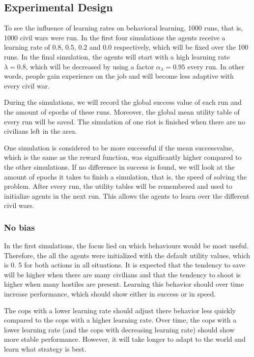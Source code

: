\subsection{Experimental Design}
To see the influence of learning rates on behavioral learning, 1000 runs, that is, 1000 civil wars were run.
In the first four simulations the agents receive a learning rate of $0.
8$, $0.
5$, $0.
2$ and $0.
0$ respectively, which will be fixed over the 100 runs.
In the final simulation, the agents will start with a high learning rate $\lambda = 0.8$, 
which will be decreased by using a factor  $\alpha_\lambda = 0.95$ every run.
In other words, people gain experience on the job and will become less adaptive with every civil war.


During the simulations, we will record the global success value of each run and the amount of epochs of these runs.
Moreover, the global mean utility table of every run will be saved.
The simulation of one riot is finished when there are no civilians left in the area.


One simulation is considered to be more successful if the mean successvalue, which is the same as the reward function, was significantly higher compared to the other simulations.
If no difference in success is found, we will look at the amount of epochs it takes to finish a simulation, that is, the speed of solving the problem.
After every run, the utility tables will be remembered and used to initialize agents in the next run.
This allows the agents to learn over the different civil wars.


\subsubsection{No bias}
In the first simulations, the focus lied on which behaviours would be most useful.
Therefore, the all the agents were initialized with the default utility values, which is 0.
5 for both actions in all situations.
It is expected that the tendency to save will be higher when there are many civilians and that the tendency to shoot is higher when many hostiles are present.
Learning this behavior should over time increase performance, which should show either in success or in speed.


The cops with a lower learning rate should adjust there behavior less quickly compared to the cops with a higher learning rate.
Over time, the cops with a lower learning rate (and the cops with decreasing learning rate) should show more stable performance.
However, it will take longer to adapt to the world and learn what strategy is best.

